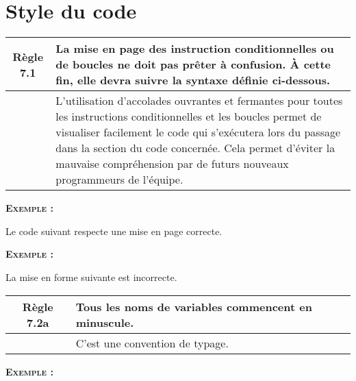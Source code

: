 \section{Style du code}

\begin{center}
\begin{tabular}{|c p{12.3cm}|}
\hline
\rowcolor{red!10}\textbf{Règle 7.1} & La mise en page des instruction conditionnelles ou de boucles ne doit pas prêter à confusion. À cette fin, elle devra suivre la syntaxe définie ci-dessous.\\ \hline
 & L’utilisation d’accolades ouvrantes et fermantes pour toutes les instructions conditionnelles et les boucles permet de visualiser facilement le code qui s’exécutera lors du passage dans la section du code concernée. Cela permet d’éviter la mauvaise compréhension par de futurs nouveaux programmeurs de l’équipe.\\ \hline
\hline
\end{tabular}
\end{center}

\smallskip
\begin{large}
\textbf{\textsc{Exemple :}}
\end{large}
Le code suivant respecte une mise en page correcte.
\smallskip


\smallskip
\begin{large}
\textbf{\textsc{Exemple :}}
\end{large}
La mise en forme suivante est incorrecte.
\smallskip


\medskip

\begin{center}
\begin{tabular}{|c p{12.3cm}|}
\hline
\rowcolor{red!10}\textbf{Règle 7.2a} & Tous les noms de variables commencent en minuscule.\\ \hline
 & C’est une convention de typage.\\ \hline
\hline
\end{tabular}
\end{center}

\smallskip
\begin{large}
\textbf{\textsc{Exemple :}}
\end{large}


\medskip

